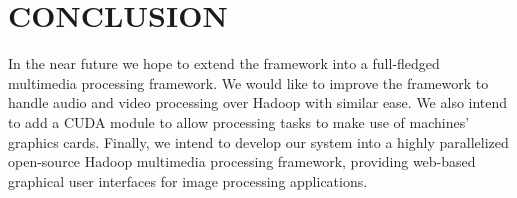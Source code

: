 \chapter{CONCLUSION}
In the near future we hope to extend the framework into a full-fledged
multimedia processing framework. We would like to improve the
framework to handle audio and video processing over Hadoop with
similar ease. We also intend to add a CUDA module to allow processing
tasks to make use of machines' graphics cards. Finally, we intend to
develop our system into a highly parallelized open-source Hadoop
multimedia processing framework, providing web-based graphical user
interfaces for image processing applications.

	
	
